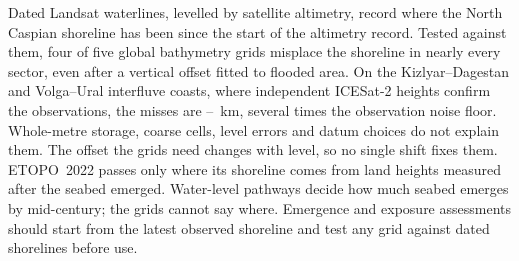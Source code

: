 Dated Landsat waterlines, levelled by satellite altimetry, record where the North Caspian shoreline has been since the start of the altimetry record. Tested against them, four of five global bathymetry grids misplace the shoreline in nearly every sector, even after a vertical offset fitted to flooded area. On the Kizlyar--Dagestan and Volga--Ural interfluve coasts, where independent ICESat-2 heights confirm the observations, the misses are --~km, several times the observation noise floor. Whole-metre storage, coarse cells, level errors and datum choices do not explain them. The offset the grids need changes with level, so no single shift fixes them. ETOPO~2022 passes only where its shoreline comes from land heights measured after the seabed emerged.  Water-level pathways decide how much seabed emerges by mid-century; the grids cannot say where. Emergence and exposure assessments should start from the latest observed shoreline and test any grid against dated shorelines before use.
